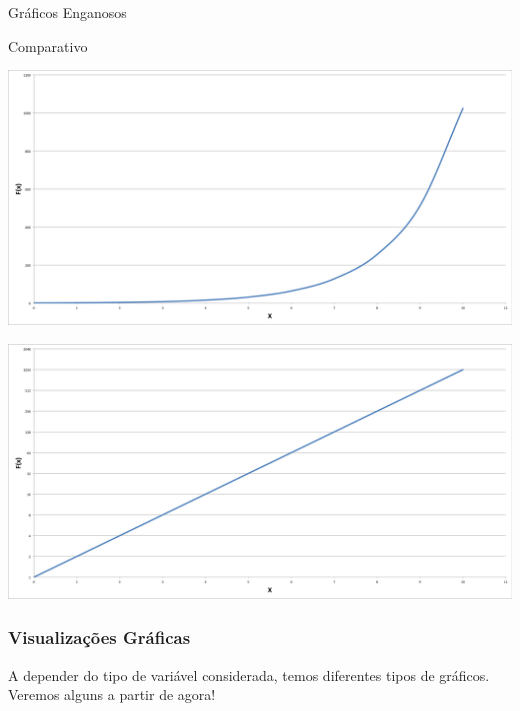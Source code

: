 \documentclass[14pt,aspectratio=1610]{beamer}
\begin{document}
\begin{frame}{Gráficos Enganosos}
	\begin{block}{Comparativo}
		\centering
		\begin{minipage}{0.48\linewidth}
			\centering
			\includegraphics[width=\linewidth]{figs/Enganoso4.png}
		\end{minipage}
		\hfill
		\begin{minipage}{0.48\linewidth}
			\centering
			\includegraphics[width=\linewidth]{figs/Enganoso5.png}
		\end{minipage}
	\end{block}
\end{frame}


\begin{frame}{}
\frametitle{Visualizações Gráficas}
\begin{block}{}
\justifying
A depender do tipo de variável considerada, temos diferentes tipos de gráficos. Veremos alguns a partir de agora!
\end{block}
\end{frame}
\end{document}
